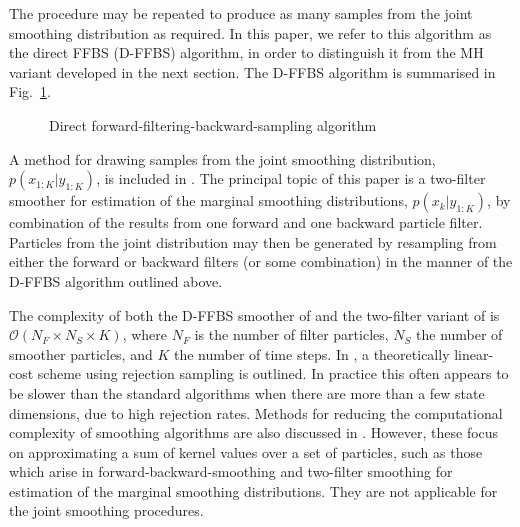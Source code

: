 \documentclass[peerreview,11pt,draftcls,onecolumn]{IEEEtran}
\begin{document}
The procedure may be repeated to produce as many samples from the joint smoothing distribution as required. In this paper, we refer to this algorithm as the direct FFBS (D-FFBS) algorithm, in order to distinguish it from the MH variant developed in the next section. The D-FFBS algorithm is summarised in Fig.~\ref{alg:DBRS}.

\begin{figure}
\caption{Direct forward-filtering-backward-sampling algorithm}
\label{alg:DBRS}
\end{figure}

A method for drawing samples from the joint smoothing distribution, $p(x_{1:K}|y_{1:K})$, is included in \cite{Briers2010}. The principal topic of this paper is a two-filter smoother for estimation of the marginal smoothing distributions, $p(x_{k}|y_{1:K})$, by combination of the results from one forward and one backward particle filter. Particles from the joint distribution may then be generated by resampling from either the forward or backward filters (or some combination) in the manner of the D-FFBS algorithm outlined above.

The complexity of both the D-FFBS smoother of \cite{Godsill2004} and the two-filter variant of \cite{Briers2010} is $\mathcal{O}(N_F \times N_S \times K)$, where $N_F$ is the number of filter particles, $N_S$ the number of smoother particles, and $K$ the number of time steps. In \cite{Douc2009}, a theoretically linear-cost scheme using rejection sampling is outlined. In practice this often appears to be slower than the standard algorithms when there are more than a few state dimensions, due to high rejection rates. Methods for reducing the computational complexity of smoothing algorithms are also discussed in \cite{Klaas2006}. However, these focus on approximating a sum of kernel values over a set of particles, such as those which arise in forward-backward-smoothing \cite{Doucet2000a} and two-filter smoothing \cite{Briers2010} for estimation of the marginal smoothing distributions. They are not applicable for the joint smoothing procedures.
\end{document}
